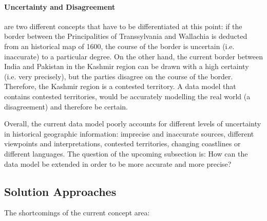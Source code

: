 
\paragraph{Uncertainty and Disagreement} %
\label{par:uncertainty_vs_disagreement}

are two different concepts that have to be differentiated at this point: if the border between the Principalities of Transsylvania and Wallachia is deducted from an historical map of 1600, the course of the border is uncertain (i.e. inaccurate) to a particular degree. On the other hand, the current border between India and Pakistan in the Kashmir region can be drawn with a high certainty (i.e. very precisely), but the parties disagree on the course of the border. Therefore, the Kashmir region is a contested territory. A data model that contains contested territories, would be accurately modelling the real world (a disagreement) and therefore be certain.




Overall, the current data model poorly accounts for different levels of uncertainty in historical geographic information: imprecise and inaccurate sources, different viewpoints and interpretations, contested territories, changing coastlines or different languages. The question of the upcoming subsection is: How can the data model be extended in order to be more accurate and more precise?








\subsection{Solution Approaches} %
\label{sub:solution_approaches}

The shortcomings of the current concept area:

